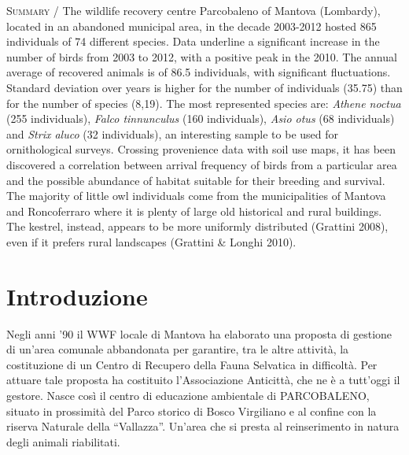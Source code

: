 {\small
\noindent \textsc{\color{MUSEBLUE} Summary} / The wildlife recovery centre Parcobaleno of Mantova (Lombardy), located
in an abandoned municipal area, in the decade 2003-2012 hosted 865
individuals of 74 different species. Data underline a significant
increase in the number of birds from 2003 to 2012, with a positive peak
in the 2010. The annual average of recovered animals is of 86.5
individuals, with significant fluctuations. Standard deviation over
years is higher for the number of individuals (35.75) than for the
number of species (8,19). The most represented species are:
\textit{Athene noctua }(255 individuals), \textit{Falco tinnunculus}
(160 individuals), \textit{Asio otus} (68 individuals) and
\textit{Strix aluco} (32 individuals), an interesting sample to be used
for ornithological surveys. Crossing provenience data with soil use
maps, it has been discovered a correlation between arrival frequency of
birds from a particular area and the possible abundance of habitat
suitable for their breeding and survival. The majority of little owl
individuals come from the municipalities of Mantova and Roncoferraro
where it is plenty of large old historical and rural buildings. The
kestrel, instead, appears to be more uniformly distributed (Grattini
2008), even if it prefers rural landscapes (Grattini \& Longhi 2010). \\
}
\section*{Introduzione}
Negli anni '90 il WWF locale di Mantova ha elaborato
una proposta di gestione di un{\textquoteright}area comunale
abbandonata per garantire, tra le altre attivit\`a, la costituzione di
un Centro di Recupero della Fauna Selvatica in difficolt\`a. Per
attuare tale proposta ha costituito l'Associazione
Anticitt\`a, che ne \`e a tutt{\textquoteright}oggi il gestore. Nasce
cos\`i il centro di educazione ambientale di PARCOBALENO, situato in
prossimit\`a del Parco storico di Bosco Virgiliano e al confine con la
riserva Naturale della {\textquotedblleft}Vallazza{\textquotedblright}.
Un'area che si presta al reinserimento in natura degli
animali riabilitati.

